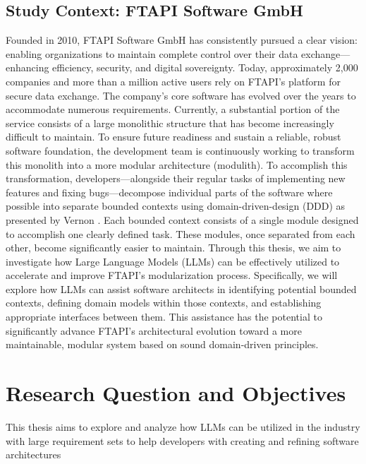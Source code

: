 \documentclass[12pt,a4paper]{article}
\begin{document}
\subsection{Study Context: FTAPI Software GmbH}
Founded in 2010, FTAPI Software GmbH has consistently pursued a clear vision: enabling organizations to maintain complete control over their data exchange—enhancing efficiency, security, and digital sovereignty. Today, approximately 2,000 companies and more than a million active users rely on FTAPI's platform for secure data exchange.
The company's core software has evolved over the years to accommodate numerous requirements. Currently, a substantial portion of the service consists of a large monolithic structure that has become increasingly difficult to maintain. To ensure future readiness and sustain a reliable, robust software foundation, the development team is continuously working to transform this monolith into a more modular architecture (modulith).
To accomplish this transformation, developers—alongside their regular tasks of implementing new features and fixing bugs—decompose individual parts of the software where possible into separate bounded contexts using domain-driven-design (DDD) as presented by Vernon \autocite[p.62]{vernon2013implementing}. Each bounded context consists of a single module designed to accomplish one clearly defined task. These modules, once separated from each other, become significantly easier to maintain.
Through this thesis, we aim to investigate how Large Language Models (LLMs) can be effectively utilized to accelerate and improve FTAPI's modularization process. Specifically, we will explore how LLMs can assist software architects in identifying potential bounded contexts, defining domain models within those contexts, and establishing appropriate interfaces between them. This assistance has the potential to significantly advance FTAPI's architectural evolution toward a more maintainable, modular system based on sound domain-driven principles.

\section{Research Question and Objectives}

This thesis aims to explore and analyze how LLMs can be utilized in the industry with large requirement sets to help developers with creating and refining software architectures
\end{document}
